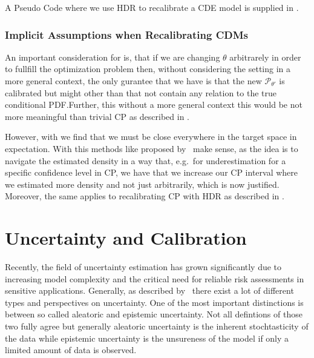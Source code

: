 A Pseudo Code where we use HDR to recalibrate a CDE model is supplied in .

\subsubsection{Implicit Assumptions when Recalibrating CDMs}\label{sec:implicit_assumptions_cde}

An important consideration for  is, that if we are changing $\theta$ arbitrarely in order to fullfill the optimization problem then, without considering the setting in a more general context, the only gurantee that we have is that the new $\mathscr{P}_{\theta'}$ is calibrated but might other than that not contain any relation to the true conditional PDF.\@ Further, this without a more general context this would be not more meaningful than trivial CP as described in .

However, with  we find that we must be close everywhere in the target space in expectation. With this methods like proposed by~\cite{sesia2021conformal} make sense, as the idea is to navigate the estimated density in a way that, e.g.\ for underestimation for a specific confidence level in CP, we have that we increase our CP interval where we estimated more density and not just arbitrarily, which is now justified. Moreover, the same applies to recalibrating CP with HDR as described in .

\section{Uncertainty and Calibration}\label{sec:uncertainty_calibration}

Recently, the field of uncertainty estimation has grown significantly due to increasing model complexity and the critical need for reliable risk assessments in sensitive applications. Generally, as described by~\cite{hullermeier_aleatoric_2021} there exist a lot of different types and perspectives on uncertainty. One of the most important distinctions is between so called aleatoric and epistemic uncertainty. Not all defintions of those two fully agree but generally aleatoric uncertainty is the inherent stochtasticity of the data while epistemic uncertainty is the unsureness of the model if only a limited amount of data is observed.

